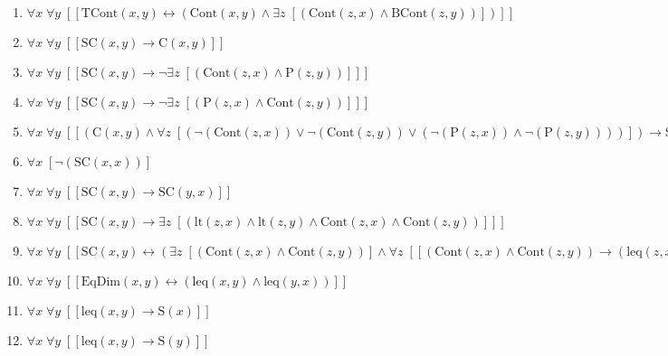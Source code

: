\documentclass{article}
\begin{document}
\begin{enumerate}
\item $\forall x\; \forall y\;  \left[ \left[ \textrm{TCont}(x,y) \leftrightarrow \left(\textrm{Cont}(x,y) \land \exists z\;  \left[ \left(\textrm{Cont}(z,x) \land \textrm{BCont}(z,y)\right) \right]\right) \right] \right]$
\item $\forall x\; \forall y\;  \left[ \left[ \textrm{SC}(x,y) \rightarrow \textrm{C}(x,y) \right] \right]$
\item $\forall x\; \forall y\;  \left[ \left[ \textrm{SC}(x,y) \rightarrow \neg \exists z\;  \left[ \left(\textrm{Cont}(z,x) \land \textrm{P}(z,y)\right) \right] \right] \right]$
\item $\forall x\; \forall y\;  \left[ \left[ \textrm{SC}(x,y) \rightarrow \neg \exists z\;  \left[ \left(\textrm{P}(z,x) \land \textrm{Cont}(z,y)\right) \right] \right] \right]$
\item $\forall x\; \forall y\;  \left[ \left[ \left(\textrm{C}(x,y) \land \forall z\;  \left[ \left(\neg \left(\textrm{Cont}(z,x)\right) \lor \neg \left(\textrm{Cont}(z,y)\right) \lor \left(\neg \left(\textrm{P}(z,x)\right) \land \neg \left(\textrm{P}(z,y)\right)\right)\right) \right]\right) \rightarrow \textrm{SC}(x,y) \right] \right]$
\item $\forall x\;  \left[ \neg \left(\textrm{SC}(x,x)\right) \right]$
\item $\forall x\; \forall y\;  \left[ \left[ \textrm{SC}(x,y) \rightarrow \textrm{SC}(y,x) \right] \right]$
\item $\forall x\; \forall y\;  \left[ \left[ \textrm{SC}(x,y) \rightarrow \exists z\;  \left[ \left(\textrm{lt}(z,x) \land \textrm{lt}(z,y) \land \textrm{Cont}(z,x) \land \textrm{Cont}(z,y)\right) \right] \right] \right]$
\item $\forall x\; \forall y\;  \left[ \left[ \textrm{SC}(x,y) \leftrightarrow \left(\exists z\;  \left[ \left(\textrm{Cont}(z,x) \land \textrm{Cont}(z,y)\right) \right] \land \forall z\;  \left[ \left[ \left(\textrm{Cont}(z,x) \land \textrm{Cont}(z,y)\right) \rightarrow \left(\textrm{leq}(z,x) \land \neg \left(\textrm{EqDim}(z,x)\right) \land \textrm{leq}(z,y) \land \neg \left(\textrm{EqDim}(z,y)\right)\right) \right] \right]\right) \right] \right]$
\item $\forall x\; \forall y\;  \left[ \left[ \textrm{EqDim}(x,y) \leftrightarrow \left(\textrm{leq}(x,y) \land \textrm{leq}(y,x)\right) \right] \right]$
\item $\forall x\; \forall y\;  \left[ \left[ \textrm{leq}(x,y) \rightarrow \textrm{S}(x) \right] \right]$
\item $\forall x\; \forall y\;  \left[ \left[ \textrm{leq}(x,y) \rightarrow \textrm{S}(y) \right] \right]$

\end{enumerate}
\end{document}
